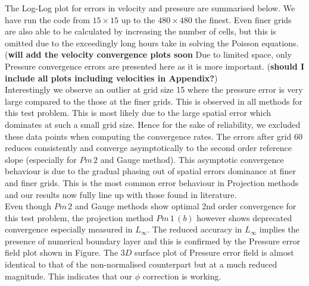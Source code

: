 The Log-Log plot for errors in velocity and pressure are summarised below. We have run the code from $15 \times 15$ up to the $480 \times 480$ the finest. Even finer grids are also able to be calculated by increasing the number of cells, but this is omitted due to the exceedingly long hours take in solving the Poisson equations. (\textbf{will add the velocity convergence plots soon} Due to limited space, only Pressure convergence errors are presented here as it is more important. (\textbf{should I include all plots including velocities in Appendix?})\\

Interestingly we observe an outlier at grid size 15 where the pressure error is very large compared to the those at the finer grids. This is observed in all methods for this test problem. This is most likely due to the large spatial error which dominates at such a small grid size. Hence for the sake of reliability, we excluded these data points when computing the convergence rates. The errors after grid 60 reduces consistently and converge asymptotically to the second order reference slope (especially for $Pm\,2$ and Gauge method). This asymptotic convergence behaviour is due to the gradual phasing out of spatial errors dominance at finer and finer grids. This is the most common error behaviour in Projection methods and our results now fully line up with those found in literature. \\

Even though $Pm\,2$ and Gauge methods show optimal 2nd order convergence for this test problem, the projection method $Pm\,1\,(b)$ however shows deprecated convergence especially measured in $L_\infty$. The reduced accuracy in $L_\infty$ implies the presence of numerical boundary layer and this is confirmed by the Pressure error field plot shown in Figure. The $3D$ surface plot of Pressure error field is almost identical to that of the non-normalised counterpart but at a much reduced magnitude. This indicates that our $\phi$ correction is working. \\

